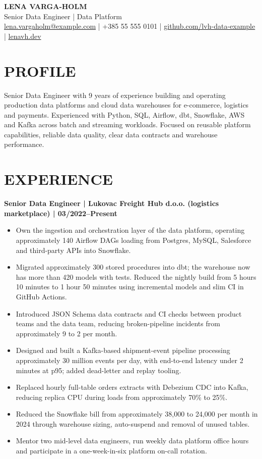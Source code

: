 \documentclass[11pt,a4paper]{article}
\begin{document}
\begin{center}
{\Huge\bfseries\color{primarycolor} LENA VARGA-HOLM}\\[0.25em]
{\large Senior Data Engineer | Data Platform}\\[0.2em]
\small \href{mailto:lena.vargaholm@example.com}{lena.vargaholm@example.com} | +385 55 555 0101 | \href{https://github.com/lvh-data-example}{github.com/lvh-data-example} | \href{https://lenavh.dev}{lenavh.dev}
\end{center}

\section*{PROFILE}
Senior Data Engineer with 9 years of experience building and operating production data platforms and cloud data warehouses for e-commerce, logistics and payments. Experienced with Python, SQL, Airflow, dbt, Snowflake, AWS and Kafka across batch and streaming workloads. Focused on reusable platform capabilities, reliable data quality, clear data contracts and warehouse performance.

\section*{EXPERIENCE}
\textbf{Senior Data Engineer | Lukovac Freight Hub d.o.o. (logistics marketplace) | 03/2022--Present}
\begin{itemize}
\item Own the ingestion and orchestration layer of the data platform, operating approximately 140 Airflow DAGs loading from Postgres, MySQL, Salesforce and third-party APIs into Snowflake.
\item Migrated approximately 300 stored procedures into dbt; the warehouse now has more than 420 models with tests. Reduced the nightly build from 5 hours 10 minutes to 1 hour 50 minutes using incremental models and slim CI in GitHub Actions.
\item Introduced JSON Schema data contracts and CI checks between product teams and the data team, reducing broken-pipeline incidents from approximately 9 to 2 per month.
\item Designed and built a Kafka-based shipment-event pipeline processing approximately 30 million events per day, with end-to-end latency under 2 minutes at p95; added dead-letter and replay tooling.
\item Replaced hourly full-table orders extracts with Debezium CDC into Kafka, reducing replica CPU during loads from approximately 70\% to 25\%.
\item Reduced the Snowflake bill from approximately 38,000 to 24,000 per month in 2024 through warehouse sizing, auto-suspend and removal of unused tables.
\item Mentor two mid-level data engineers, run weekly data platform office hours and participate in a one-week-in-six platform on-call rotation.
\end{itemize}
\end{document}
